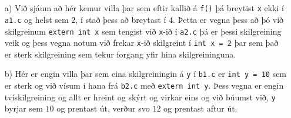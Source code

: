 \documentclass{article}
\begin{document}
	\section{}
	\begin{itemize}
		\item[a)] Við sjáum að hér kemur villa þar sem eftir kallið á 
			\texttt{f()} þá breytist \texttt{x} ekki í \texttt{a1.c} og 
			helst sem $2$, í stað þess að breytast í $4$. Þetta er vegna 
			þess að þó við skilgreinum \texttt{extern int x} sem tengist 
			við \texttt{x}-ið í \texttt{a2.c} þá er þessi skilgreining veik 
			og þess vegna notum við frekar \texttt{x}-ið skilgreint í 
			\texttt{int x = 2} þar sem það er sterk skilgreining sem tekur 
			forgang yfir hina skilgreininguna.
		\item[b)] Hér er engin villa þar sem eina skilgreiningin á \texttt{y} 
			í \texttt{b1.c} er \texttt{int y = 10} sem er sterk og við 
			vísum í hana frá \texttt{b2.c} með \texttt{extern int y}. 
			Þess vegna er engin tvískilgreining og allt er hreint og skýrt 
			og virkar eins og við búumst við, \texttt{y} byrjar sem $10$ og 
			prentast út, verður svo $12$ og prentast aftur út.
	\end{itemize}
\end{document}
